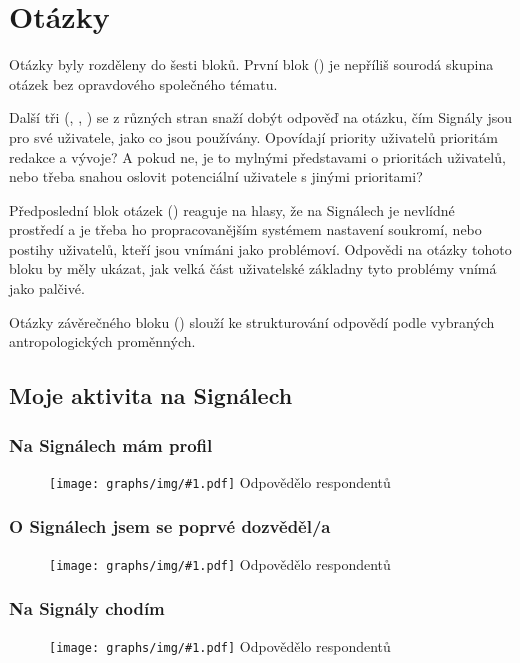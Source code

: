 \documentclass[12pt, a4paper, twoside]{article}
\newcommand{\answercount}[1]{Odpovědělo  respondentů}
\newcommand{\includegraph}[2]{
  \begin{figure}[H]
    \centering
    \textbf{#2}
    \texttt{[image: graphs/img/\#1.pdf]}
    \answercount{#1}
  \end{figure}
}
\begin{document}
\section{Otázky}

Otázky byly rozděleny do šesti bloků.
První blok ()
je nepříliš sourodá skupina otázek bez opravdového společného tématu.

Další tři
(, , )
se z různých stran snaží dobýt odpověď na otázku, čím Signály jsou
pro své uživatele, jako co jsou používány.
Opovídají priority uživatelů prioritám redakce a vývoje?
A pokud ne, je to mylnými představami o prioritách uživatelů,
nebo třeba snahou oslovit potenciální uživatele s jinými prioritami?

Předposlední blok otázek ()
reaguje na hlasy, že na Signálech je nevlídné prostředí
a je třeba ho  propracovanějším systémem nastavení
soukromí, nebo postihy uživatelů, kteří jsou vnímáni jako problémoví.
Odpovědi na otázky tohoto bloku by měly ukázat, jak velká část
uživatelské základny tyto problémy vnímá jako palčivé.

Otázky závěrečného bloku ()
slouží ke strukturování odpovědí
podle vybraných antropologických proměnných.

\subsection{Moje aktivita na Signálech}\label{sec:mojeaktivita}

\subsubsection{Na Signálech mám profil}

\includegraph{na_signalech_mam_profil}{}

\subsubsection{O Signálech jsem se poprvé dozvěděl/a}

\includegraph{o_signalech_jsem_se_poprve_dozvedel}{}

\subsubsection{Na Signály chodím}

\includegraph{na_signaly_chodim}{}
\end{document}
